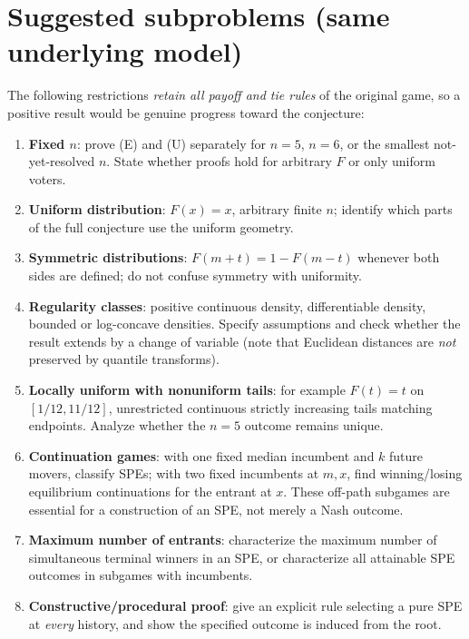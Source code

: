 \documentclass[11pt]{article}
\begin{document}
\section{Suggested subproblems (same underlying model)}
The following restrictions \emph{retain all payoff and tie rules} of the original game, so a positive result would be genuine progress toward the conjecture:
\begin{enumerate}[label=\textbf{R\arabic*.}]
\item \textbf{Fixed $n$}: prove (E) and (U) separately for $n=5$, $n=6$, or the smallest not-yet-resolved $n$. State whether proofs hold for arbitrary $F$ or only uniform voters.
\item \textbf{Uniform distribution}: $F(x)=x$, arbitrary finite $n$; identify which parts of the full conjecture use the uniform geometry.
\item \textbf{Symmetric distributions}: $F(m+t)=1-F(m-t)$ whenever both sides are defined; do not confuse symmetry with uniformity.
\item \textbf{Regularity classes}: positive continuous density, differentiable density, bounded or log-concave densities. Specify assumptions and check whether the result extends by a change of variable (note that Euclidean distances are \emph{not} preserved by quantile transforms).
\item \textbf{Locally uniform with nonuniform tails}: for example $F(t)=t$ on $[1/12,11/12]$, unrestricted continuous strictly increasing tails matching endpoints. Analyze whether the $n=5$ outcome remains unique.
\item \textbf{Continuation games}: with one fixed median incumbent and $k$ future movers, classify SPEs; with two fixed incumbents at $m,x$, find winning/losing equilibrium continuations for the entrant at $x$. These off-path subgames are essential for a construction of an SPE, not merely a Nash outcome.
\item \textbf{Maximum number of entrants}: characterize the maximum number of simultaneous terminal winners in an SPE, or characterize all attainable SPE outcomes in subgames with incumbents.
\item \textbf{Constructive/procedural proof}: give an explicit rule selecting a pure SPE at \emph{every} history, and show the specified outcome is induced from the root.
\end{enumerate}
\end{document}
